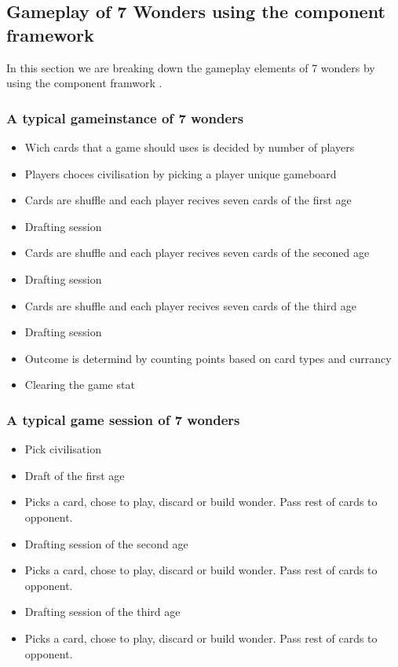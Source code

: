 \documentclass[a4paper]{article}
\begin{document}
\subsection{Gameplay of 7 Wonders using the component framework}
In this section we are breaking down the gameplay elements of 7 wonders by using the component framwork \cite{bjork2003describing}.
\subsubsection{A typical gameinstance of 7 wonders}

\begin{itemize}[noitemsep,topsep=0pt,parsep=0pt,partopsep=0pt]
  \item Wich cards that a game should uses is decided by number of players
  \item Players choces civilisation by picking a player unique gameboard
  \item Cards are shuffle and each player recives seven cards of the first age
  \item Drafting session
  \item Cards are shuffle and each player recives seven cards of the seconed age
  \item Drafting session
  \item Cards are shuffle and each player recives seven cards of the third age
  \item Drafting session
  \item Outcome is determind by counting points based on card types and currancy
  \item Clearing the game stat
\end{itemize}

\subsubsection{A typical game session of 7 wonders}
\begin{itemize}[noitemsep,topsep=0pt,parsep=0pt,partopsep=0pt]
  \item Pick civilisation
  \item Draft of the first age
  \item Picks a card, chose to play, discard or build wonder. Pass rest of cards to opponent.
  \item Drafting session of the second age
  \item Picks a card, chose to play, discard or build wonder. Pass rest of cards to opponent.
  \item Drafting session of the third age
  \item Picks a card, chose to play, discard or build wonder. Pass rest of cards to opponent.
\end{itemize}
\end{document}
